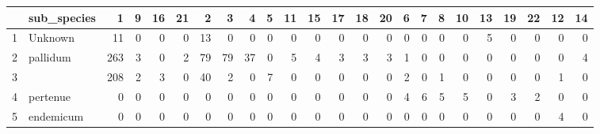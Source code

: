 \begin{table}[ht]
\centering
\begin{tabular}{llrrrrrrrrrrrrrrrrrrrrrr}
  \hline
 & sub\_species & 1 & 9 & 16 & 21 & 2 & 3 & 4 & 5 & 11 & 15 & 17 & 18 & 20 & 6 & 7 & 8 & 10 & 13 & 19 & 22 & 12 & 14 \\ 
  \hline
1 & Unknown & 11 & 0 & 0 & 0 & 13 & 0 & 0 & 0 & 0 & 0 & 0 & 0 & 0 & 0 & 0 & 0 & 0 & 5 & 0 & 0 & 0 & 0 \\ 
  2 & pallidum & 263 & 3 & 0 & 2 & 79 & 79 & 37 & 0 & 5 & 4 & 3 & 3 & 3 & 1 & 0 & 0 & 0 & 0 & 0 & 0 & 0 & 4 \\ 
  3 &  & 208 & 2 & 3 & 0 & 40 & 2 & 0 & 7 & 0 & 0 & 0 & 0 & 0 & 2 & 0 & 1 & 0 & 0 & 0 & 0 & 1 & 0 \\ 
  4 & pertenue & 0 & 0 & 0 & 0 & 0 & 0 & 0 & 0 & 0 & 0 & 0 & 0 & 0 & 4 & 6 & 5 & 5 & 0 & 3 & 2 & 0 & 0 \\ 
  5 & endemicum & 0 & 0 & 0 & 0 & 0 & 0 & 0 & 0 & 0 & 0 & 0 & 0 & 0 & 0 & 0 & 0 & 0 & 0 & 0 & 0 & 4 & 0 \\ 
   \hline
\end{tabular}
\end{table}
